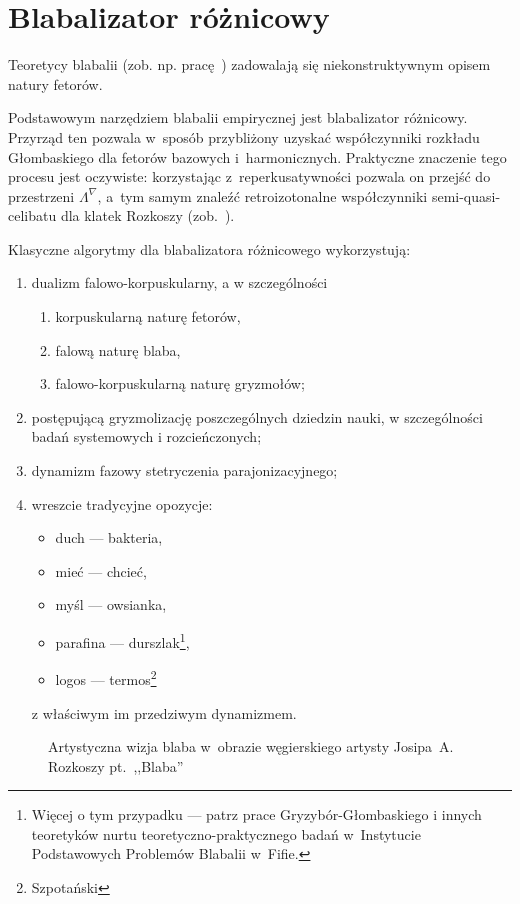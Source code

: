 \documentclass[licencjacka]{pracamgr}
\begin{document}
\section{Blabalizator różnicowy}

Teoretycy blabalii (zob. np. pracę~\cite{grglo}) zadowalają się
niekonstruktywnym opisem natury fetorów.

Podstawowym narzędziem blabalii empirycznej jest blabalizator
różnicowy.  Przyrząd ten pozwala w~sposób przybliżony uzyskać
współczynniki rozkładu Głombaskiego dla fetorów bazowych
i~harmonicznych.  Praktyczne znaczenie tego procesu jest oczywiste:
korzystając z~reperkusatywności pozwala on przejść do przestrzeni
$\Lambda^{\nabla}$, a~tym samym znaleźć retroizotonalne współczynniki
semi-quasi-celibatu dla klatek Rozkoszy (zob.~\cite{JR}).

Klasyczne algorytmy dla blabalizatora różnicowego wykorzystują:
\begin{enumerate}
\item dualizm falowo-korpuskularny, a w szczególności
  \begin{enumerate}
  \item korpuskularną naturę fetorów,
  \item falową naturę blaba,
  \item falowo-korpuskularną naturę gryzmołów;
  \end{enumerate}
\item postępującą gryzmolizację poszczególnych dziedzin nauki, w
  szczególności badań systemowych i rozcieńczonych;
\item dynamizm fazowy stetryczenia parajonizacyjnego;
\item wreszcie tradycyjne opozycje:
  \begin{itemize}
  \item duch --- bakteria,
  \item mieć --- chcieć,
  \item myśl --- owsianka,
  \item parafina --- durszlak\footnote{Więcej o tym przypadku --- patrz
      prace Gryzybór-Głombaskiego i innych teoretyków nurtu
      teoretyczno-praktycznego badań w~Instytucie Podstawowych
      Problemów Blabalii w~Fifie.},
  \item logos --- termos\footnote{Szpotański}
  \end{itemize}
  z właściwym im przedziwym dynamizmem.
\end{enumerate}

\begin{figure}[tp]
  \centering
  \caption{Artystyczna wizja blaba w~obrazie węgierskiego artysty
    Josipa~A. Rozkoszy pt.~,,Blaba''}
\end{figure}
\end{document}
